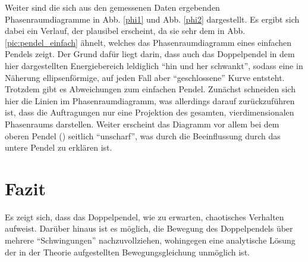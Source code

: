 Weiter sind die sich aus den gemessenen Daten ergebenden Phasenraumdiagramme in Abb. \ref{phi1} und Abb. \ref{phi2} dargestellt. Es ergibt sich dabei ein Verlauf, der plausibel erscheint, da sie sehr dem in Abb. \ref{pic:pendel_einfach} ähnelt, welches das Phasenraumdiagramm eines einfachen Pendels zeigt. Der Grund dafür liegt darin, dass auch das Doppelpendel in dem hier dargestellten Energiebereich leldiglich \enquote{hin und her schwankt}, sodass eine in Näherung ellipsenförmige, auf jeden Fall aber \enquote{geschlossene} Kurve entsteht. \\
Trotzdem gibt es Abweichungen zum einfachen Pendel. Zunächst schneiden sich hier die Linien im Phasenraumdiagramm, was allerdings darauf zurückzuführen ist, dass die Auftragungen nur eine Projektion des gesamten, vierdimensionalen Phasenraums darstellen. Weiter erscheint das Diagramm vor allem bei dem oberen Pendel () seitlich \enquote{unscharf}, was durch die Beeinflussung durch das untere Pendel zu erklären ist. 

\section{Fazit}
Es zeigt sich, dass das Doppelpendel, wie zu erwarten, chaotisches Verhalten aufweist. Darüber hinaus ist es möglich, die Bewegung des Doppelpendels über mehrere \enquote{Schwingungen} nachzuvollziehen, wohingegen eine analytische Lösung der in der Theorie aufgestellten Bewegungsgleichung unmöglich ist. 